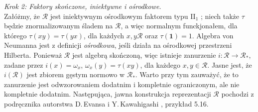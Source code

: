 {\it Krok 2: Faktory skończone, iniektywne i ośrodkowe.}\\
Załóżmy, że $\mathcal{R}$ jest iniektywnym ośrodkowym faktorem typu
II$\phantom{}_{1}$ \cite{Takesaki3};
niech także $\tau$ będzie znormalizowanym śladem na $\mathcal{R}$,
a więc normalnym funckjonałem, dla którego
$\tau(xy) = \tau(yx)$, dla każdych $x,y \mathcal{R}$
oraz $\tau(\mathbf{1}) = 1$.
Algebra von Neumanna jest z definicji \emph{ośrodkowa},
jeśli działa na ośrodkowej przestrzeni Hilberta.
Ponieważ $\mathcal{R}$ jest algebrą skończoną, więc istnieje zanurzenie
$i: \mathcal{R} \rightarrow
\mathcal{R}_{*}$, zadane przez $i(x) = \omega_{x}$, $\omega_{x}(y) = \tau(xy)$,
dla każdego $x,y \in \mathcal{R}$.
Jasne jest, że $i(\mathcal{R})$
jest zbiorem gęstym normowo w $\mathcal{R}_{*}$.
Warto przy tym zauważyć, że to zanurzenie jest odwzorowaniem dodatnim i kompletnie
ograniczonym, ale nie kompletnie dodatnim.
Następująca, jawna konstrukcja reprezentacji $\mathcal{R}$
pochodzi z podręcznika autorstwa D.\,Evansa  i Y.\,Kawahigashi
\cite{Evans1998}, przykład 5.16.

